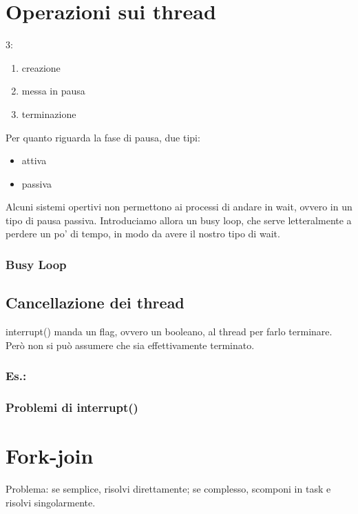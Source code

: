 \section{Operazioni sui thread}
3:
\begin{enumerate}
    \item creazione
    \item messa in pausa
    \item terminazione
\end{enumerate}
Per quanto riguarda la fase di pausa, due tipi:
\begin{itemize}
    \item attiva
    \item passiva
\end{itemize}
Alcuni sistemi opertivi non permettono ai processi di andare in wait, ovvero in un tipo di pausa passiva. Introduciamo allora un busy loop, che serve letteralmente a perdere un po' di tempo, in modo da avere il nostro tipo di wait.

\subsubsection{Busy Loop}

\subsection{Cancellazione dei thread}

interrupt() manda un flag, ovvero un booleano, al thread per farlo terminare. Però non si può assumere che sia effettivamente terminato.

\subsubsection{Es.:}

\subsubsection{Problemi di interrupt()}

\section{Fork-join}
Problema: se semplice, risolvi direttamente; se complesso, scomponi in task e risolvi singolarmente.


